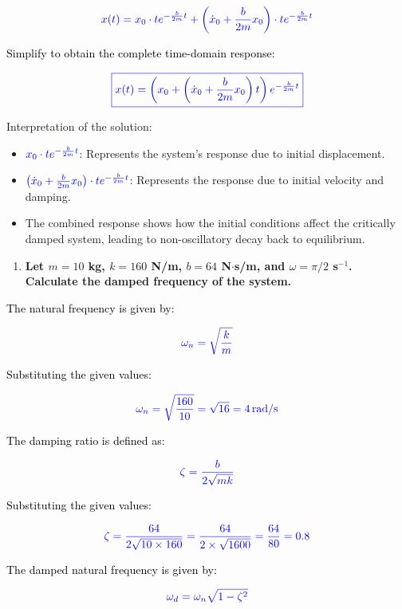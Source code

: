 \documentclass{article}
\begin{document}
\[
	\textcolor{blue}{x(t) = x_0 \cdot t e^{-\frac{b}{2m}t} + \left(\dot{x}_0 + \frac{b}{2m}x_0\right) \cdot t e^{-\frac{b}{2m}t}}
\]

\noindent
\textcolor{black}{Simplify to obtain the complete time-domain response:}

\[
	\textcolor{blue}{\boxed{x(t) = \left(x_0 + \left(\dot{x}_0 + \frac{b}{2m}x_0\right)t\right) e^{-\frac{b}{2m}t}}}
\]
	      
\noindent Interpretation of the solution:
	      
\begin{itemize}
	\item \(\textcolor{blue}{x_0 \cdot t e^{-\frac{b}{2m}t}}\): Represents the system's response due to initial displacement.
	\item \(\textcolor{blue}{\left(\dot{x}_0 + \frac{b}{2m}x_0\right) \cdot t e^{-\frac{b}{2m}t}}\): Represents the response due to initial velocity and damping.
	\item The combined response shows how the initial conditions affect the critically damped system, leading to non-oscillatory decay back to equilibrium.
\end{itemize}
\begin{enumerate}  
	\item[(d)] \textbf{Let $m = 10$ kg, $k = 160$ N/m, $b = 64$ N$\cdot$s/m, and $\omega = \pi/2$ s$^{-1}$. Calculate the damped frequency of the system.}
\end{enumerate}
\noindent
\textcolor{black}{The natural frequency is given by:}

\[
	\textcolor{blue}{\omega_n = \sqrt{\frac{k}{m}}}
\]

\noindent
\textcolor{black}{Substituting the given values:}

\[
	\textcolor{blue}{\omega_n = \sqrt{\frac{160}{10}} = \sqrt{16} = 4 \, \text{rad/s}}
\]

\noindent
\textcolor{black}{The damping ratio is defined as:}

\[
	\textcolor{blue}{\zeta = \frac{b}{2\sqrt{mk}}}
\]

\noindent
\textcolor{black}{Substituting the given values:}

\[
	\textcolor{blue}{\zeta = \frac{64}{2\sqrt{10 \times 160}} = \frac{64}{2 \times \sqrt{1600}} = \frac{64}{80} = 0.8}
\]

\noindent
\textcolor{black}{The damped natural frequency is given by:}

\[
	\textcolor{blue}{\omega_d = \omega_n \sqrt{1 - \zeta^2}}
\]
\end{document}
